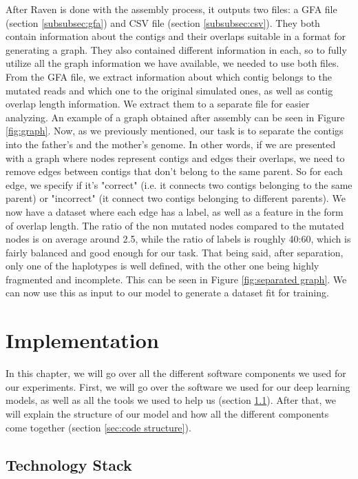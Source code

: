\documentclass[times, utf8, diplomski, english]{fer_eng}
\begin{document}
After Raven is done with the assembly process, it outputs two files: a GFA file (section \ref{subsubsec:gfa}) and CSV file (section \ref{subsubsec:csv}). They both contain information about the contigs and their overlaps suitable in a format for generating a graph. They also contained different information in each, so to fully utilize all the graph information we have available, we needed to use both files. From the GFA file, we extract information about which contig belongs to the mutated reads and which one to the original simulated ones, as well as contig overlap length information. We extract them to a separate file for easier analyzing. An example of a graph obtained after assembly can be seen in Figure \ref{fig:graph}. Now, as we previously mentioned, our task is to separate the contigs into the father's and the mother's genome. In other words, if we are presented with a graph where nodes represent contigs and edges their overlaps, we need to remove edges between contigs that don't belong to the same parent. So for each edge, we specify if it's "correct" (i.e. it connects two contigs belonging to the same parent) or "incorrect" (it connect two contigs belonging to different parents). We now have a dataset where each edge has a label, as well as a feature in the form of overlap length. The ratio of the non mutated nodes compared to the mutated nodes is on average around 2.5, while the ratio of labels is roughly 40:60, which is fairly balanced and good enough for our task. That being said, after separation, only one of the haplotypes is well defined, with the other one being highly fragmented and incomplete. This can be seen in Figure \ref{fig:separated graph}. We can now use this as input to our model to generate a dataset fit for training.

\chapter{Implementation}

In this chapter, we will go over all the different software components we used for our experiments. First, we will go over the software we used for our deep learning models, as well as all the tools we used to help us (section \ref{sec:technology stack}). After that, we will explain the structure of our model and how all the different components come together (section \ref{sec:code structure}).

\section{Technology Stack}
\label{sec:technology stack}
\end{document}
